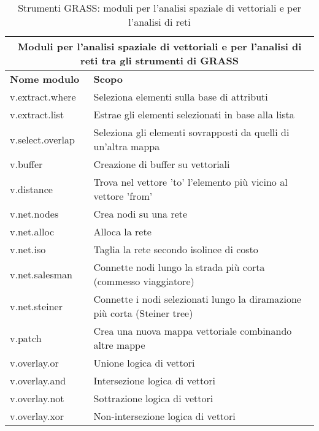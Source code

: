 \begin{table}[ht]
\centering
\caption{Strumenti GRASS: moduli per l'analisi spaziale di vettoriali e per l'analisi di reti}\medskip
 \begin{tabular}{|p{4cm}|p{12cm}|}
  \hline \multicolumn{2}{|c|}{\textbf{Moduli per l'analisi spaziale di vettoriali e per l'analisi di reti tra gli strumenti di GRASS}} \\
  \hline \textbf{Nome modulo} & \textbf{Scopo} \\
  \hline v.extract.where & Seleziona elementi sulla base di attributi \\
  \hline v.extract.list & Estrae gli elementi selezionati in base alla lista \\
  \hline v.select.overlap & Seleziona gli elementi sovrapposti da quelli di un'altra mappa \\
  \hline v.buffer & Creazione di buffer su vettoriali \\
  \hline v.distance & Trova nel vettore 'to' l'elemento più vicino al vettore 'from' \\
  \hline v.net.nodes & Crea nodi su una rete \\
  \hline v.net.alloc & Alloca la rete \\
  \hline v.net.iso & Taglia la rete secondo isolinee di costo \\
  \hline v.net.salesman & Connette nodi lungo la strada più corta (commesso viaggiatore) \\
  \hline v.net.steiner & Connette i nodi selezionati lungo la diramazione più corta (Steiner
  tree) \\
  \hline v.patch & Crea una nuova mappa vettoriale combinando altre mappe \\
  \hline v.overlay.or & Unione logica di vettori \\
  \hline v.overlay.and & Intersezione logica di vettori \\
  \hline v.overlay.not & Sottrazione logica di vettori \\
  \hline v.overlay.xor & Non-intersezione logica di vettori \\
\hline
\end{tabular}
\end{table}

